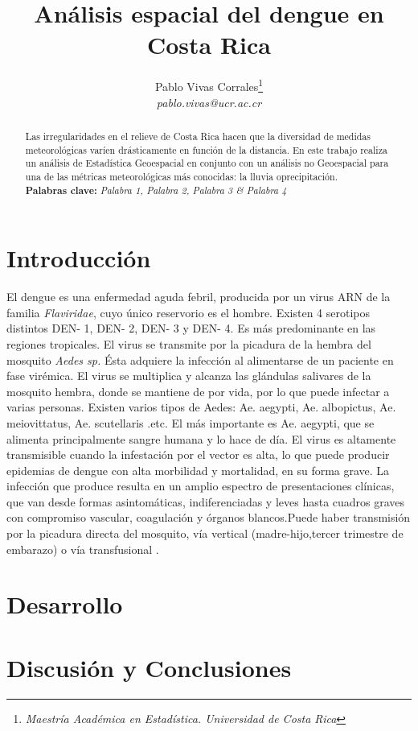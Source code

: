 \documentclass[12pt,a4paper]{article}
\author{Pablo Vivas Corrales\footnote{\textit{Maestría Académica en Estadística. Universidad de Costa Rica}}\\\textit{pablo.vivas@ucr.ac.cr}}
\title{Análisis espacial del dengue en Costa Rica}
\begin{document}
\maketitle
\begin{abstract}
\noindent
Las irregularidades en el relieve de Costa Rica hacen que la diversidad de medidas meteorológicas varíen drásticamente en función de la distancia. En este trabajo realiza un análisis de Estadística Geoespacial en conjunto con un análisis no Geoespacial para una de las métricas meteorológicas más conocidas: la lluvia oprecipitación.\\
\newline
\textbf{Palabras clave:} \textit{Palabra 1, Palabra 2, Palabra 3 \& Palabra 4} 
\end{abstract}
\section{Introducción}
El dengue es una enfermedad aguda febril, producida por un virus ARN de la familia
\textit{Flaviridae}, cuyo único reservorio es el hombre. Existen 4 serotipos distintos DEN- 1, DEN- 2, DEN- 3 y DEN- 4. Es más predominante en las regiones tropicales. El virus se transmite por la picadura de la hembra del mosquito \textit{Aedes sp.} Ésta adquiere la infección al alimentarse de un paciente en fase virémica. El virus se multiplica y alcanza las glándulas salivares de la mosquito hembra, donde se mantiene de por vida, por lo que puede infectar a varias personas. Existen varios tipos de Aedes: Ae. aegypti, Ae. albopictus, Ae. meiovittatus, Ae. scutellaris .etc. El más importante es Ae. aegypti, que se alimenta principalmente sangre humana y lo hace de día. El virus es altamente transmisible cuando la infestación por el vector es alta, lo que puede producir epidemias de dengue con alta morbilidad y mortalidad, en su forma grave. La infección que produce resulta en un amplio espectro de presentaciones clínicas, que van desde formas asintomáticas, indiferenciadas y leves hasta cuadros graves con compromiso vascular, coagulación y órganos blancos.Puede haber transmisión por la picadura directa del mosquito, vía vertical (madre-hijo,tercer trimestre de embarazo) o vía transfusional \cite{CajaCostarricensedelSeguroSocial2013}.
\section{Desarrollo}
\section{Discusión y Conclusiones}




\end{document}

